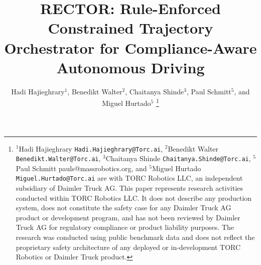 \documentclass[lettersize,journal, twocolumn]{IEEEtran}
\begin{document}
\title{\textsc{RECTOR}: Rule-Enforced Constrained Trajectory Orchestrator
for Compliance-Aware Autonomous Driving}

\author{Hadi Hajieghrary$^{1}$, Benedikt Walter$^{2}$, Chaitanya Shinde$^{3}$, Paul Schmitt$^{5}$, and Miguel Hurtado$^{5}$%
\thanks{$^{1}$Hadi Hajieghrary {\tt\small Hadi.Hajieghrary@Torc.ai}, $^{2}$Benedikt Walter {\tt\small Benedikt.Walter@Torc.ai}, $^{3}$Chaitanya Shinde {\tt\small Chaitanya.Shinde@Torc.ai}, $^{5}$Paul Schmitt {pauls@massrobotics.org}, and $^{5}$Miguel Hurtado {\tt\small Miguel.Hurtado@Torc.ai} are with TORC Robotics LLC, an independent subsidiary of Daimler Truck AG. This paper represents research activities conducted within TORC Robotics LLC. It does not describe any production system, does not constitute the safety case for any Daimler Truck AG product or development program, and has not been reviewed by Daimler Truck AG for regulatory compliance or product liability purposes. The research was conducted using public benchmark data and does not reflect the proprietary safety architecture of any deployed or in-development TORC Robotics or Daimler Truck product.}%
 }

\maketitle
\end{document}
